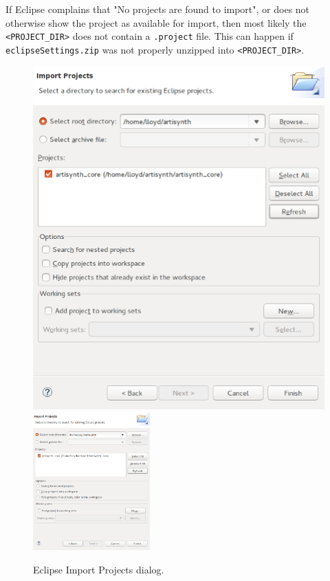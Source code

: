 \begin{sideblock}
If Eclipse complains that {\sf "No projects are found to import"}, or
does not otherwise show the project as available for import,
then most likely the {\tt <PROJECT\_DIR>}
\directory{} does not contain a {\tt .project} file. This 
can happen if {\tt eclipseSettings.zip} was not properly unzipped into
{\tt <PROJECT\_DIR>}.
\end{sideblock}

\begin{figure}
\begin{center}
\iflatexml
   \includegraphics{images/EclipseImportProjectsLinuxSmall}
\else
   \includegraphics[width=0.4\textwidth]{images/EclipseImportProjectsLinux}
\fi   
\end{center}
\caption{Eclipse Import Projects dialog.}%
\label{EclipseImportProjects:fig}
\end{figure}

